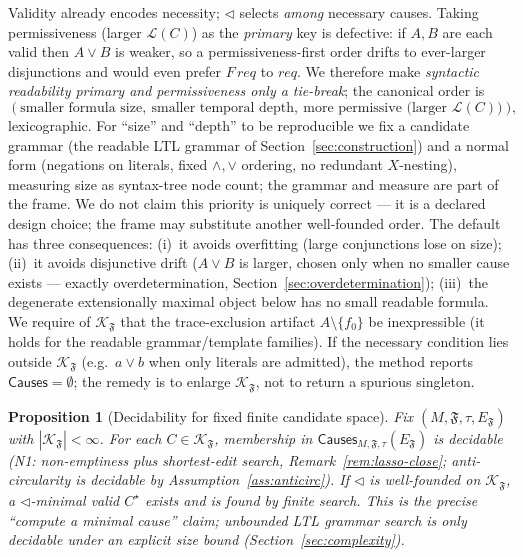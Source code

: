 \documentclass[11pt]{article}
\newtheorem{theorem}{Proposition}
\theoremstyle{remark}
\newcommand{\Lang}{\mathcal{L}}
\newcommand{\Frame}{\mathfrak{F}}
\begin{document}
Validity already encodes necessity; \(\triangleleft\) selects \emph{among}
necessary causes. Taking permissiveness (larger \(\Lang(C)\)) as the
\emph{primary} key is defective: if \(A,B\) are each valid then \(A\lor B\) is
weaker, so a permissiveness-first order drifts to ever-larger disjunctions and
would even prefer \(F\,req\) to \(req\). We therefore make \emph{syntactic
readability primary and permissiveness only a tie-break}; the canonical order is
\[
  (\text{smaller formula size},\ \text{smaller temporal depth},\
   \text{more permissive (larger }\Lang(C)\text{)}),
\]
lexicographic. For ``size'' and ``depth'' to be reproducible we fix a candidate
grammar (the readable LTL grammar of Section~\ref{sec:construction}) and a normal
form (negations on literals, fixed \(\land,\lor\) ordering, no redundant
\(X\)-nesting), measuring size as syntax-tree node count; the grammar and measure
are part of the frame. We do not claim this priority is uniquely correct --- it is
a declared design choice; the frame may substitute another well-founded order. The
default has three consequences: (i)~it avoids overfitting (large conjunctions lose
on size); (ii)~it avoids disjunctive drift (\(A\lor B\) is larger, chosen only
when no smaller cause exists --- exactly overdetermination,
Section~\ref{sec:overdetermination}); (iii)~the degenerate extensionally maximal
object below has no small readable formula. We require of \(\mathcal{K}_{\Frame}\)
that the trace-exclusion artifact \(A\setminus\{f_0\}\) be inexpressible (it holds
for the readable grammar/template families). If the necessary condition
lies outside \(\mathcal{K}_{\Frame}\) (e.g.\ \(a\lor b\) when only literals are
admitted), the method reports \(\mathsf{Causes}=\emptyset\); the remedy is to
enlarge \(\mathcal{K}_{\Frame}\), not to return a spurious singleton.

\begin{theorem}[Decidability for fixed finite candidate space]
\label{thm:finite-K}
Fix \((M,\Frame,\tau,E_{\Frame})\) with \(|\mathcal{K}_{\Frame}|<\infty\). For
each \(C\in\mathcal{K}_{\Frame}\), membership in
\(\mathsf{Causes}_{M,\Frame,\tau}(E_{\Frame})\) is decidable (N1: non-emptiness
plus shortest-edit search, Remark~\ref{rem:lasso-close}; anti-circularity is
decidable by Assumption~\ref{ass:anticirc}). If \(\triangleleft\) is
well-founded on \(\mathcal{K}_{\Frame}\), a \(\triangleleft\)-minimal valid
\(C^\star\) exists and is found by finite search. This is the precise ``compute a
minimal cause'' claim; unbounded LTL grammar search is only decidable under an
explicit size bound (Section~\ref{sec:complexity}).
\end{theorem}
\end{document}
